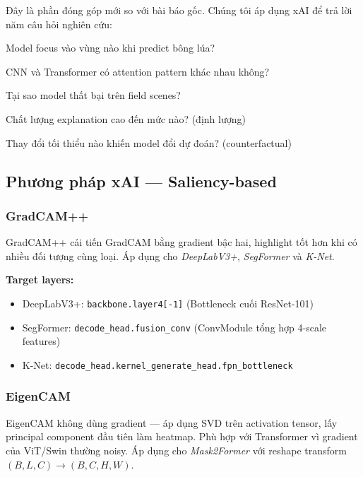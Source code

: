 \documentclass[12pt, a4paper]{article}
\begin{document}
Đây là phần đóng góp mới so với bài báo gốc. Chúng tôi áp dụng xAI để trả lời năm câu hỏi nghiên cứu:

\begin{description}[leftmargin=3.5cm, labelwidth=3cm]
  \item[\textbf{RQ1}] Model focus vào vùng nào khi predict bông lúa?
  \item[\textbf{RQ2}] CNN và Transformer có attention pattern khác nhau không?
  \item[\textbf{RQ3}] Tại sao model thất bại trên field scenes?
  \item[\textbf{RQ4}] Chất lượng explanation cao đến mức nào? (định lượng)
  \item[\textbf{RQ5}] Thay đổi tối thiểu nào khiến model đổi dự đoán? (counterfactual)
\end{description}

\subsection{Phương pháp xAI --- Saliency-based}

\subsubsection{GradCAM++ \cite{chattopadhay2018gradcampp}}
GradCAM++ cải tiến GradCAM bằng gradient bậc hai, highlight tốt hơn khi có nhiều đối tượng cùng loại. Áp dụng cho \textit{DeepLabV3+}, \textit{SegFormer} và \textit{K-Net}.

\smallskip
\noindent\textbf{Target layers:}
\begin{itemize}[noitemsep]
  \item DeepLabV3+: \texttt{backbone.layer4[-1]} (Bottleneck cuối ResNet-101)
  \item SegFormer: \texttt{decode\_head.fusion\_conv} (ConvModule tổng hợp 4-scale features)
  \item K-Net: \texttt{decode\_head.kernel\_generate\_head.fpn\_bottleneck}
\end{itemize}

\subsubsection{EigenCAM \cite{muhammad2020eigencam}}
EigenCAM không dùng gradient --- áp dụng SVD trên activation tensor, lấy principal component đầu tiên làm heatmap. Phù hợp với Transformer vì gradient của ViT/Swin thường noisy. Áp dụng cho \textit{Mask2Former} với reshape transform $(B, L, C) \to (B, C, H, W)$.
\end{document}
